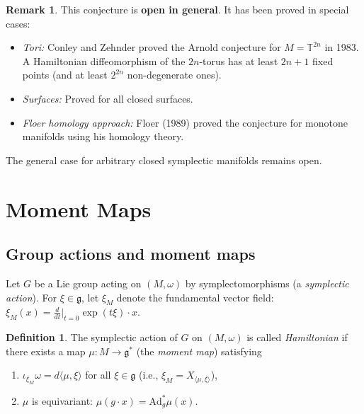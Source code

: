\documentclass[12pt,a4paper]{amsart}
\theoremstyle{definition}
\newtheorem{definition}[theorem]{Definition}
\newtheorem{remark}[theorem]{Remark}
\begin{document}
\begin{remark}
This conjecture is \textbf{open in general}.  It has been proved in special
cases:
\begin{itemize}
  \item \textit{Tori:} Conley and Zehnder proved the Arnold conjecture for
    $M = \mathbb{T}^{2n}$ in 1983.  A Hamiltonian diffeomorphism of the
    $2n$-torus has at least $2n+1$ fixed points (and at least $2^{2n}$
    non-degenerate ones).
  \item \textit{Surfaces:} Proved for all closed surfaces.
  \item \textit{Floer homology approach:} Floer (1989) proved the conjecture
    for monotone manifolds using his homology theory.
\end{itemize}
The general case for arbitrary closed symplectic manifolds remains open.
\end{remark}

\section{Moment Maps}
\label{sec:moment}

\subsection{Group actions and moment maps}

Let $G$ be a Lie group acting on $(M, \omega)$ by symplectomorphisms
(a \emph{symplectic action}).  For $\xi \in \mathfrak{g}$, let $\xi_M$
denote the fundamental vector field: $\xi_M(x) = \frac{d}{dt}\big|_{t=0}
\exp(t\xi) \cdot x$.

\begin{definition}
The symplectic action of $G$ on $(M, \omega)$ is called \emph{Hamiltonian}
if there exists a map $\mu: M \to \mathfrak{g}^*$ (the \emph{moment map})
satisfying
\begin{enumerate}[label=(\roman*)]
  \item $\iota_{\xi_M}\omega = d\langle \mu, \xi \rangle$ for all
        $\xi \in \mathfrak{g}$ (i.e., $\xi_M = X_{\langle\mu,\xi\rangle}$),
  \item $\mu$ is equivariant: $\mu(g \cdot x) = \mathrm{Ad}^*_g \mu(x)$.
\end{enumerate}
\end{definition}
\end{document}
